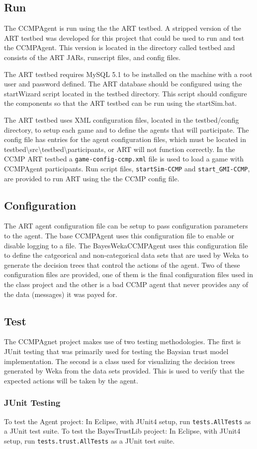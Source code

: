 \subsection{Run}
The CCMPAgent is run using the the ART testbed.  A stripped version of the
ART testbed was developed for this project that could be used to run and test
the CCMPAgent.  This version is located in the directory called testbed and
consists of the ART JARs, runscript files, and config files.  

The ART testbed requires MySQL 5.1 to be installed on the machine with a root
user and password defined.  The ART database should be configured using the
startWizard script located in the testbed directory.  This script should
configure the components so that the ART testbed can be run using the
startSim.bat.

The ART testbed uses XML configuration files, located in the testbed/config
directory, to setup each game and to define the agents that will participate. The
config file has entries for the agent configuration files, which must be located
in testbed\textbackslash src\textbackslash testbed\textbackslash participants, or
ART will not function correctly.  In the CCMP ART testbed a
\verb+game-config-ccmp.xml+ file is used to load a game with CCMPAgent
participants.  Run script files, \verb+startSim-CCMP+ and \verb+start_GMI-CCMP+,
are provided to run ART using the the CCMP config file.

\subsection{Configuration}
The ART agent configuration file can be setup to pass configuration parameters
to the agent.  The base CCMPAgent uses this configuration file to enable or
disable logging to a file.  The BayesWekaCCMPAgent uses this configuration file
to define the catgeorical and non-categorical data sets that are used by Weka
to generate the decision trees that control the actions of the agent.  Two of
these configuration files are provided, one of them is the final configuration
files used in the class project and the other is a bad CCMP agent that never
provides any of the data (messages) it was payed for.

\subsection{Test}
The CCMPAgnet project makes use of two testing methodologies.  The first is
JUnit testing that was primarily used for testing the Baysian trust model
implementation.  The second is a class used for visualizing the decision trees
generated by Weka from the data sets provided.  This is used to verify that the
expected actions will be taken by the agent.

\subsubsection{JUnit Testing}
To test the Agent project: In Eclipse, with JUnit4 setup, run
\verb+tests.AllTests+ as a JUnit test suite.  To test the BayesTrustLib project:
In Eclipse, with JUnit4 setup, run \verb+tests.trust.AllTests+ as a JUnit test
suite.
